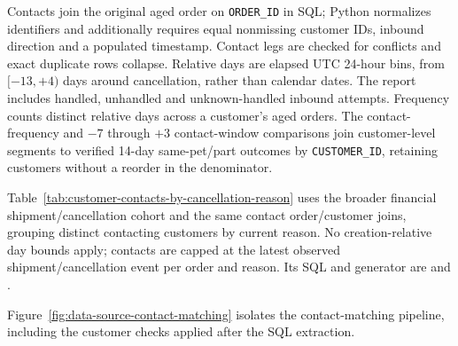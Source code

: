 Contacts join the original aged order on \texttt{ORDER\_ID} in SQL; Python
normalizes identifiers and additionally requires equal nonmissing customer IDs,
inbound direction and a populated timestamp. Contact legs are checked for
conflicts and exact duplicate rows collapse. Relative days are elapsed UTC
24-hour bins, from $[-13,+4)$ days around cancellation, rather than calendar
dates. The report includes handled, unhandled and unknown-handled inbound
attempts. Frequency counts distinct relative days across a customer's aged
orders. The contact-frequency and $-7$ through $+3$ contact-window comparisons
join customer-level segments to verified 14-day same-pet/part outcomes by
\texttt{CUSTOMER\_ID}, retaining customers without a reorder in the denominator.

Table~\ref{tab:customer-contacts-by-cancellation-reason} uses the broader financial
shipment/cancellation cohort and the same contact order/customer joins, grouping
distinct contacting customers by current reason. No creation-relative day bounds
apply; contacts are capped at the latest observed shipment/cancellation
event per order and reason. Its SQL and generator are
 and
.

Figure~\ref{fig:data-source-contact-matching} isolates the contact-matching
pipeline, including the customer checks applied after the SQL extraction.




